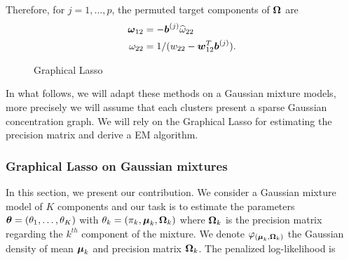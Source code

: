 Therefore, for $j=1,\dots,p$, the permuted target components of $\boldsymbol\Omega$ are
\begin{align*}
  \boldsymbol \omega_{12} &= -\boldsymbol b^{(j)}\widehat\omega_{22}\\
  \omega_{22} &= 1/(w_{22}-\boldsymbol w_{12}^T \boldsymbol b^{(j)}).
\end{align*}
\begin{figure}
\begin{center}
   \caption{Graphical Lasso}
   \label{fig:friedman_graph_lasso}

\end{center}
\end{figure}
In what follows, we will adapt these methods on a Gaussian mixture models, more precisely we will assume that each clusters present a sparse Gaussian concentration graph. We will rely on the Graphical Lasso for estimating the precision matrix and derive a EM algorithm.

\subsubsection{Graphical Lasso on Gaussian mixtures}

In this section, we present our contribution. We consider a Gaussian mixture model of $K$ components and our task is to estimate the parameters ${\boldsymbol\theta}=(\theta_1,\dots,\theta_K)$ with $\theta_k=(\pi_k, \boldsymbol\mu_k, \boldsymbol\Omega_k)$ where $\boldsymbol\Omega_k$ is the precision matrix regarding the $k^{th}$ component of the mixture. We denote $\varphi_{(\boldsymbol\mu_{k},\boldsymbol\Omega_{k})}$ the Gaussian density of mean $\boldsymbol\mu_k$ and precision matrix $\boldsymbol\Omega_k$. The penalized log-likelihood is

